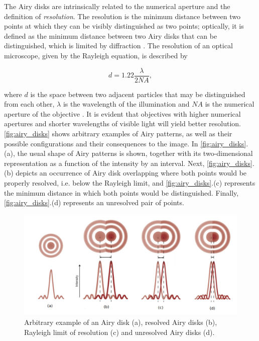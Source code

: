 The Airy disks are intrinsically related to the numerical aperture and the definition of \emph{resolution}. The resolution is the minimum distance between two points at which they can be visibly distinguished as two points; optically, it is defined as the minimum distance between two Airy disks that can be distinguished, which is limited by diffraction \cite{leng2009materials}. The resolution of an optical microscope, given by the Rayleigh equation, is described by

\begin{equation}
\label{eqn:resolution}
d = 1.22 \frac{\lambda}{2 NA},
\end{equation}

\noindent where $d$ is the space between two adjacent particles that may be distinguished from each other, $\lambda$ is the wavelength of the illumination and $NA$ is the numerical aperture of the objective \cite{davidson2002optical}. It is evident that objectives with higher numerical apertures and shorter wavelengths of visible light will yield better resolution. \autoref{fig:airy_disks} shows arbitrary examples of Airy patterns, as well as their possible configurations and their consequences to the image. In \autoref{fig:airy_disks}.(a), the usual shape of Airy patterns is shown, together with its two-dimensional representation as a function of the intensity by an interval. Next, \autoref{fig:airy_disks}.(b) depicts an occurrence of Airy disk overlapping where both points would be properly resolved, i.e. below the Rayleigh limit, and \autoref{fig:airy_disks}.(c) represents the minimum distance in which both points would be distinguished. Finally, \autoref{fig:airy_disks}.(d) represents an unresolved pair of points.

\begin{figure}[htb]
	\centering
	\caption{\label{fig:airy_disks} Arbitrary example of an Airy disk (a), resolved Airy disks (b), Rayleigh limit of resolution (c) and unresolved Airy disks (d).} 
	\begin{center}
	    \includegraphics[scale=0.4]{images/airy_disks.png}
	\end{center}
	\centering
\end{figure}

